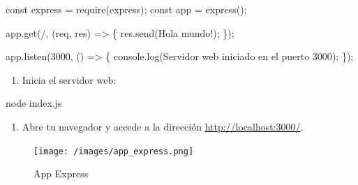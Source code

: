 \documentclass[
  a4paper,
  DIV=11,
  numbers=noendperiod,
  onepage,
  openany]{scrreprt}
\newenvironment{Shaded}{\begin{snugshade}}{\end{snugshade}}
\newcommand{\BuiltInTok}[1]{\textcolor[rgb]{0.00,0.23,0.31}{#1}}
\newcommand{\DecValTok}[1]{\textcolor[rgb]{0.68,0.00,0.00}{#1}}
\newcommand{\ExtensionTok}[1]{\textcolor[rgb]{0.00,0.23,0.31}{#1}}
\newcommand{\FunctionTok}[1]{\textcolor[rgb]{0.28,0.35,0.67}{#1}}
\newcommand{\KeywordTok}[1]{\textcolor[rgb]{0.00,0.23,0.31}{#1}}
\newcommand{\NormalTok}[1]{\textcolor[rgb]{0.00,0.23,0.31}{#1}}
\newcommand{\OperatorTok}[1]{\textcolor[rgb]{0.37,0.37,0.37}{#1}}
\newcommand{\PreprocessorTok}[1]{\textcolor[rgb]{0.68,0.00,0.00}{#1}}
\newcommand{\StringTok}[1]{\textcolor[rgb]{0.13,0.47,0.30}{#1}}
\providecommand{\tightlist}{%
  \setlength{\itemsep}{0pt}\setlength{\parskip}{0pt}}\usepackage{longtable,booktabs,array}
\begin{document}
\begin{Shaded}
\begin{Highlighting}[]
\KeywordTok{const}\NormalTok{ express }\OperatorTok{=} \PreprocessorTok{require}\NormalTok{(}\StringTok{\textquotesingle{}express\textquotesingle{}}\NormalTok{)}\OperatorTok{;}
\KeywordTok{const}\NormalTok{ app }\OperatorTok{=} \FunctionTok{express}\NormalTok{()}\OperatorTok{;}

\NormalTok{app}\OperatorTok{.}\FunctionTok{get}\NormalTok{(}\StringTok{\textquotesingle{}/\textquotesingle{}}\OperatorTok{,}\NormalTok{ (req}\OperatorTok{,}\NormalTok{ res) }\KeywordTok{=\textgreater{}}\NormalTok{ \{}
\NormalTok{  res}\OperatorTok{.}\FunctionTok{send}\NormalTok{(}\StringTok{\textquotesingle{}Hola mundo!\textquotesingle{}}\NormalTok{)}\OperatorTok{;}
\NormalTok{\})}\OperatorTok{;}

\NormalTok{app}\OperatorTok{.}\FunctionTok{listen}\NormalTok{(}\DecValTok{3000}\OperatorTok{,}\NormalTok{ () }\KeywordTok{=\textgreater{}}\NormalTok{ \{}
  \BuiltInTok{console}\OperatorTok{.}\FunctionTok{log}\NormalTok{(}\StringTok{\textquotesingle{}Servidor web iniciado en el puerto 3000\textquotesingle{}}\NormalTok{)}\OperatorTok{;}
\NormalTok{\})}\OperatorTok{;}
\end{Highlighting}
\end{Shaded}

\begin{enumerate}
\def\labelenumi{\arabic{enumi}.}
\setcounter{enumi}{4}
\tightlist
\item
  Inicia el servidor web:
\end{enumerate}

\begin{Shaded}
\begin{Highlighting}[]
\ExtensionTok{node}\NormalTok{ index.js}
\end{Highlighting}
\end{Shaded}

\begin{enumerate}
\def\labelenumi{\arabic{enumi}.}
\setcounter{enumi}{5}
\tightlist
\item
  Abre tu navegador y accede a la dirección
  \url{http://localhost:3000/}.
\end{enumerate}

\begin{figure}[H]

{\centering \texttt{[image: /images/app\_express.png]}

}

\caption{App Express}

\end{figure}%
\end{document}
